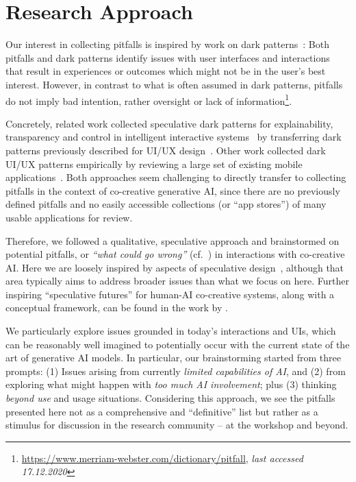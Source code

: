\documentclass[
twocolumn,
]{ceurart}
\newcommand{\lastaccessed}{\textit{last accessed 17.12.2020}}
\begin{document}
\section{Research Approach}

Our interest in collecting pitfalls is inspired by work on dark patterns~\cite{Chromik2019, DiGeronimo2020, Gray2018}: Both pitfalls and dark patterns identify issues with user interfaces and interactions that result in experiences or outcomes which might not be in the user's best interest. However, in contrast to what is often assumed in dark patterns, pitfalls do not imply bad intention, rather oversight or lack of information\footnote{\url{https://www.merriam-webster.com/dictionary/pitfall}, \lastaccessed}.

Concretely, related work collected speculative dark patterns for explainability, transparency and control in intelligent interactive systems~\cite{Chromik2019} by transferring dark patterns previously described for UI/UX design~\cite{Gray2018}. Other work collected dark UI/UX patterns empirically by reviewing a large set of existing mobile applications~\cite{DiGeronimo2020}.
Both approaches seem challenging to directly transfer to collecting pitfalls in the context of co-creative generative AI, since there are no previously defined pitfalls and no easily accessible collections (or ``app stores'') of many usable applications for review.

Therefore, we followed a qualitative, speculative approach and brainstormed on potential pitfalls, or \textit{``what could go wrong''} (cf.~\cite{Colusso2019}) in interactions with co-creative AI. Here we are loosely inspired by aspects of speculative design~\cite{Dunne2013}, although that area typically aims to address broader issues than what we focus on here. Further inspiring ``speculative futures'' for human-AI co-creative systems, along with a conceptual framework, can be found in the work by \citet{Bown2018}.

We particularly explore issues grounded in today's interactions and UIs, which can be reasonably well imagined to potentially occur with the current state of the art of generative AI models.
In particular, our brainstorming started from three prompts: (1) Issues arising from currently \textit{limited capabilities of AI}, and (2) from exploring what might happen with \textit{too much AI involvement}; plus (3) thinking \textit{beyond use} and usage situations.
Considering this approach, we see the pitfalls presented here not as a comprehensive and ``definitive'' list but rather as a stimulus for discussion in the research community -- at the workshop and beyond.
\end{document}
